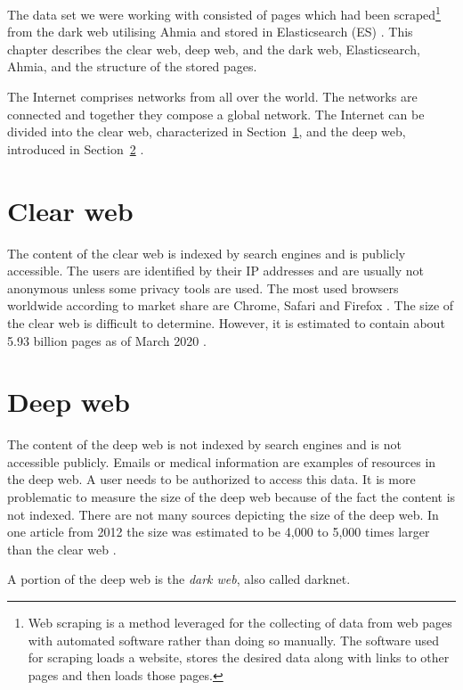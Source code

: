 \label{datasetAnalysis}
The data set we were working with consisted of pages which had been scraped\footnote{Web scraping is a method leveraged for the collecting of data from web pages with automated software rather than doing so manually. The software used for scraping loads a website, stores the desired data along with links to other pages and then loads those pages.} from the dark web utilising Ahmia \cite{ahmia} and stored in Elasticsearch (ES) \cite{elasticSearch} \cite{bcScraping}. This chapter describes the clear web, deep web, and the dark web, Elasticsearch, Ahmia, and the structure of the stored pages.

The Internet comprises networks from all over the world. The networks are connected and together they compose a global network. The Internet can be divided into the clear web, characterized in Section~\ref{clearWeb}, and the deep web, introduced in Section~\ref{deepWeb} \cite{internetStructure}.

\section{Clear web} \label{clearWeb}
The content of the clear web is indexed by search engines and is publicly accessible. The users are identified by their IP addresses and are usually not anonymous unless some privacy tools are used. The most used browsers worldwide according to market share are Chrome, Safari and Firefox \cite{browserMarketShare}. The size of the clear web is difficult to determine. However, it is estimated to contain about 5.93 billion pages as of March 2020 \cite{clearWebSize}.

\section{Deep web} \label{deepWeb}
The content of the deep web is not indexed by search engines and is not accessible publicly. Emails or medical information are examples of resources in the deep web. A user needs to be authorized to access this data. It is more problematic to measure the size of the deep web because of the fact the content is not indexed. There are not many sources depicting the size of the deep web. In one article from 2012 the size was estimated to be 4,000 to 5,000 times larger than the clear web \cite{deepWebSize}. 

A portion of the deep web is the \textit{dark web}, also called darknet. 
